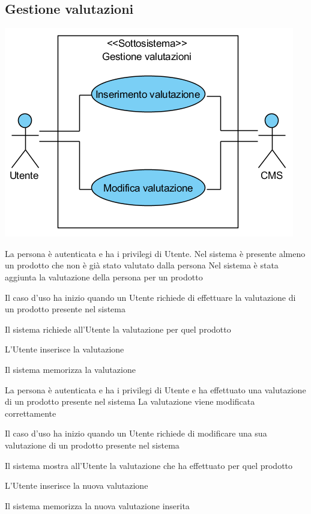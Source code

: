 \subsection{Gestione valutazioni}
\begin{center}
   \includegraphics[width=\textwidth]{assets/visualParadigm/GestioneValutazioni}
\end{center}
{}
{La persona è autenticata e ha i privilegi di Utente. Nel sistema è presente almeno un prodotto che non è già stato valutato dalla persona}
{Nel sistema è stata aggiunta la valutazione della persona per un prodotto}
{\begin{enumCU}
	\item Il caso d'uso ha inizio quando un Utente richiede di effettuare la valutazione di un prodotto presente nel sistema
	\item Il sistema richiede all'Utente la valutazione per quel prodotto
	\item L'Utente inserisce la valutazione
	\item Il sistema memorizza la valutazione
\end{enumCU}}

\tabcuvspace

{}
{La persona è autenticata e ha i privilegi di Utente e ha effettuato una valutazione di un prodotto presente nel sistema}
{La valutazione viene modificata correttamente}
{\begin{enumCU}
	\item Il caso d'uso ha inizio quando un Utente richiede di modificare una sua valutazione di un prodotto presente nel sistema
	\item Il sistema mostra all'Utente la valutazione che ha effettuato per quel prodotto
	\item L'Utente inserisce la nuova valutazione
	\item Il sistema memorizza la nuova valutazione inserita
\end{enumCU}}


